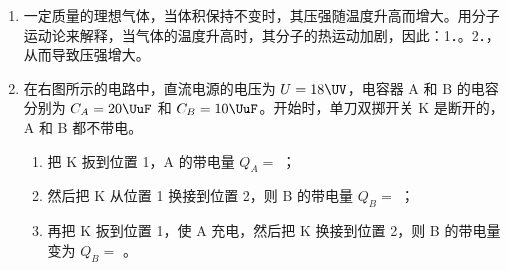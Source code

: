 \documentclass[\gkver]{gaokaozhenti}
\begin{document}
\begin{enumerate}
{以西墙支撑点为支点，东墙支撑点给横梁的支持力为 $F_{\text{东}}$，由力矩平衡得
$F_{\text{东}}\cdot L=m_{\text{车}}g\cdot 5\Um+m_{\text{梁}}g\cdot 4\Um$，
解得 $F_{\text{东}}=2.94\times10^{4}\UN$。由牛顿第三定律知东墙受到的压力为 $2.94\times10^{4}\UN$。

当天车吊着一质量为 $1600\Ukg$ 的重物使它以 $4.9\Umsq$ 的加速度上升时，对重物由牛顿第二定律得
$F-mg=ma$，解得 $F=1600\times(9.8+4.9)\UN=2.35\times10^{4}\UN$，
由牛顿第三定律知重物对车的拉力也为 $2.35\times10^{4}\UN$，故车对梁的作用力为
$F_{\text{车}}=m_{\text{车}}g+F=5.49\times10^{4}\UN$。
仍以西墙支撑点为支点，由力矩平衡得
$F_{\text{东}}'L=F_{\text{车}}\cdot 5\Um+m_{\text{梁}}g\cdot 4\Um$，
解得 $F_{\text{东}}'=4.41\times10^{4}\UN$，由牛顿第三定律知东墙受到的压力为 $4.41\times10^{4}\UN$，
故东墙承受的压力比原来增大 $1.47\times10^{4}\UN$。
}

\item
一定质量的理想气体，当体积保持不变时，其压强随温度升高而增大。用分子运动论来解释，当气体的温度升高时，其分子的热运动加剧，因此：1．。2．，从而导致压强增大。

\item
在右图所示的电路中，直流电源的电压为 $U=18\UV$，电容器 A 和 B 的电容分别为 $C_{A}=20\UuF$ 和 $C_{B}=10\UuF$。开始时，单刀双掷开关 K 是断开的，A 和 B 都不带电。
\begin{enumerate}
	\item
	把 K 扳到位置 1，A 的带电量 $Q_{A}=$ ；
	\item
	然后把 K 从位置 1 换接到位置 2，则 B 的带电量 $Q_{B}=$ ；
	\item
	再把 K 扳到位置 1，使 A 充电，然后把 K 换接到位置 2，则 B 的带电量变为 $Q_{B}=$ 。
\end{enumerate}
\end{enumerate}
\end{document}
